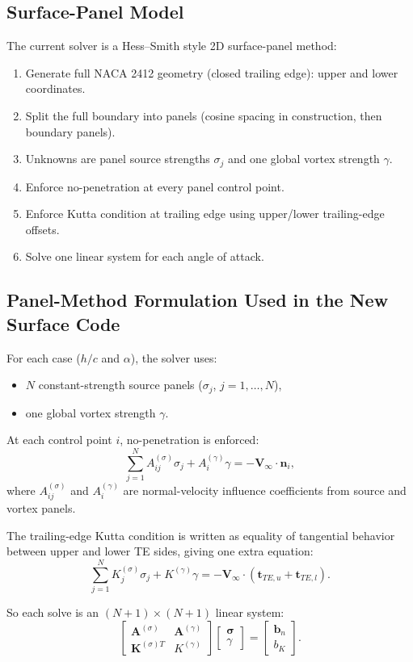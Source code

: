 \documentclass[11pt]{article}
\begin{document}
\subsection{Surface-Panel Model}
The current solver is a Hess--Smith style 2D surface-panel method:
\begin{enumerate}
  \item Generate full NACA 2412 geometry (closed trailing edge): upper and lower coordinates.
  \item Split the full boundary into panels (cosine spacing in construction, then boundary panels).
  \item Unknowns are panel source strengths $\sigma_j$ and one global vortex strength $\gamma$.
  \item Enforce no-penetration at every panel control point.
  \item Enforce Kutta condition at trailing edge using upper/lower trailing-edge offsets.
  \item Solve one linear system for each angle of attack.
\end{enumerate}

\subsection{Panel-Method Formulation Used in the New Surface Code}
For each case ($h/c$ and $\alpha$), the solver uses:
\begin{itemize}
  \item $N$ constant-strength source panels ($\sigma_j$, $j=1,\dots,N$),
  \item one global vortex strength $\gamma$.
\end{itemize}

At each control point $i$, no-penetration is enforced:
\[
\sum_{j=1}^{N} A^{(\sigma)}_{ij}\sigma_j + A^{(\gamma)}_{i}\gamma
= -\mathbf{V}_\infty\cdot\mathbf{n}_i,
\]
where $A^{(\sigma)}_{ij}$ and $A^{(\gamma)}_{i}$ are normal-velocity influence
coefficients from source and vortex panels.

The trailing-edge Kutta condition is written as equality of tangential behavior
between upper and lower TE sides, giving one extra equation:
\[
\sum_{j=1}^{N} K^{(\sigma)}_j \sigma_j + K^{(\gamma)}\gamma
= -\mathbf{V}_\infty\cdot(\mathbf{t}_{TE,u}+\mathbf{t}_{TE,l}).
\]

So each solve is an $(N+1)\times(N+1)$ linear system:
\[
\begin{bmatrix}
\mathbf{A}^{(\sigma)} & \mathbf{A}^{(\gamma)}\\
\mathbf{K}^{(\sigma)T} & K^{(\gamma)}
\end{bmatrix}
\begin{bmatrix}
\boldsymbol{\sigma}\\ \gamma
\end{bmatrix}
=
\begin{bmatrix}
\mathbf{b}_n\\ b_K
\end{bmatrix}.
\]
\end{document}
